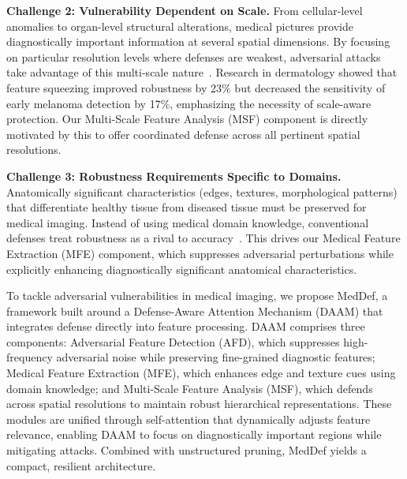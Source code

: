 \documentclass[preprint,12pt]{elsarticle}
\begin{document}
\textbf{Challenge 2: Vulnerability Dependent on Scale.} From cellular-level anomalies to organ-level structural alterations, medical pictures provide diagnostically important information at several spatial dimensions. By focusing on particular resolution levels where defenses are weakest, adversarial attacks take advantage of this multi-scale nature~\cite{Sahu24}. Research in dermatology showed that feature squeezing improved robustness by 23\% but decreased the sensitivity of early melanoma detection by 17\%, emphasizing the necessity of scale-aware protection. Our Multi-Scale Feature Analysis (MSF) component is directly motivated by this to offer coordinated defense across all pertinent spatial resolutions.

\textbf{Challenge 3: Robustness Requirements Specific to Domains.} Anatomically significant characteristics (edges, textures, morphological patterns) that differentiate healthy tissue from diseased tissue must be preserved for medical imaging. Instead of using medical domain knowledge, conventional defenses treat robustness as a rival to accuracy~\cite{Sriramanan21}. This drives our Medical Feature Extraction (MFE) component, which suppresses adversarial perturbations while explicitly enhancing diagnostically significant anatomical characteristics.

To tackle adversarial vulnerabilities in medical imaging, we propose MedDef, a framework built around a Defense-Aware Attention Mechanism (DAAM) that integrates defense directly into feature processing. DAAM comprises three components: Adversarial Feature Detection (AFD), which suppresses high-frequency adversarial noise while preserving fine-grained diagnostic features; Medical Feature Extraction (MFE), which enhances edge and texture cues using domain knowledge; and Multi-Scale Feature Analysis (MSF), which defends across spatial resolutions to maintain robust hierarchical representations. These modules are unified through self-attention that dynamically adjusts feature relevance, enabling DAAM to focus on diagnostically important regions while mitigating attacks. Combined with unstructured pruning, MedDef yields a compact, resilient architecture.
\end{document}
